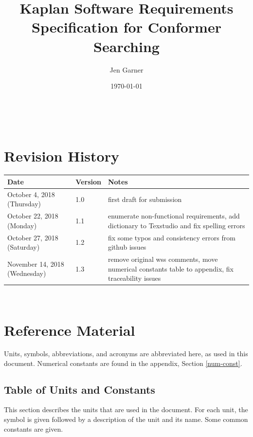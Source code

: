 \documentclass[12pt]{article}
\begin{document}
\title{Kaplan Software Requirements Specification for Conformer Searching} 
\author{Jen Garner}
\date{\today}
	
\maketitle

~\newpage


\section{Revision History}\label{1rev-hist}

\begin{tabularx}{\textwidth}{p{3cm}p{2cm}X}
\toprule {\bf Date} & {\bf Version} & {\bf Notes}\\
\midrule
October 4, 2018 (Thursday) & 1.0 & first draft for 
submission \\
October 22, 2018 (Monday) & 1.1 & enumerate 
non-functional requirements, add dictionary to 
Texstudio and fix spelling errors \\
October 27, 2018 (Saturday) & 1.2 & fix some typos and consistency errors from 
github issues\\
November 14, 2018 (Wednesday) & 1.3 & remove original wss comments, move 
numerical constants table to appendix, fix traceability issues \\
\bottomrule
\end{tabularx}

~\newpage

\section{Reference Material}\label{section-ref-tables}

Units, symbols, abbreviations, and acronyms are abbreviated here, as 
used in this document. Numerical constants are found in the appendix, Section 
\ref{num-const}.

\subsection{Table of Units and Constants}

This section describes the units that are used in the document. For each unit, 
the symbol is given followed by a
description of the unit and its name. Some common constants are given.
~\newline
\end{document}
